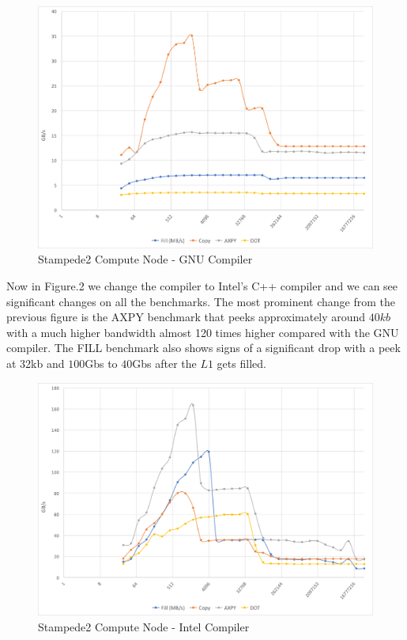 \documentclass[12pt]{article} %
\begin{document}
\begin{figure}[htb]
\caption{Stampede2 Compute Node - GNU Compiler}\label{fig:benchmark01}
\centering
\includegraphics[width=\textwidth,keepaspectratio]{imgs/img01.png}
\end{figure} 

\newpage

Now in Figure.2 we change the compiler to Intel's C++ compiler and we can see significant changes on all the benchmarks. The most prominent change from the previous figure is the \textsc{AXPY}  benchmark that peeks approximately around $40kb$ with a much higher bandwidth almost 120 times higher compared with the GNU compiler.  The \textsc{FILL} benchmark also shows signs of a significant drop with a peek at 32kb and $100$Gb\/s to $40$Gb\/s  after the $L1$ gets filled.

\begin{figure}[htb]
\caption{Stampede2 Compute Node - Intel Compiler}\label{fig:benchmark02}
\centering
\includegraphics[width=\textwidth,keepaspectratio]{imgs/img02.png}
\end{figure}
\end{document}
